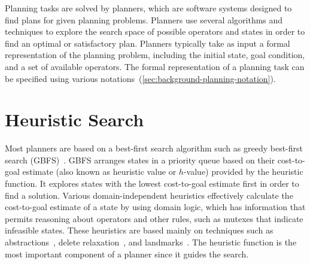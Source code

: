 \documentclass[ppgc,diss,english]{iiufrgs}
\begin{document}
Planning tasks are solved by planners, which are software systems designed to find plans for given planning problems. Planners use several algorithms and techniques to explore the search space of possible operators and states in order to find an optimal or satisfactory plan. Planners typically take as input a formal representation of the planning problem, including the initial state, goal condition, and a set of available operators. The formal representation of a planning task can be specified using various notations~(\cref{sec:background-planning-notation}).

\section{Heuristic Search}
\label{sec:intro-heuristic-search}

Most planners are based on a best-first search algorithm such as greedy best-first search (GBFS)~\cite{Doran.Michie/1966}. GBFS arranges states in a priority queue based on their cost-to-goal estimate (also known as heuristic value or $h$-value) provided by the heuristic function. It explores states with the lowest cost-to-goal estimate first in order to find a solution. Various domain-independent heuristics effectively calculate the cost-to-goal estimate of a state by using domain logic, which has information that permits reasoning about operators and other rules, such as mutexes that indicate infeasible states. These heuristics are based mainly on techniques such as abstractions~\cite{Culberson.Schaeffer/1998}, delete relaxation~\cite{Hoffmann.Nebel/2001}, and landmarks~\cite{Hoffmann.etal/2004,Helmert.Domshlak/2009}. The heuristic function is the most important component of a planner since it guides the search.
\end{document}
